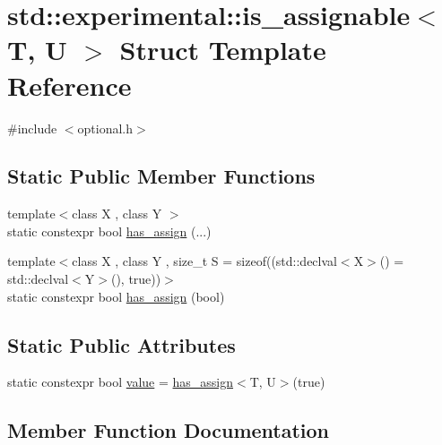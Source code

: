 \hypertarget{structstd_1_1experimental_1_1is__assignable}{}\section{std\+:\+:experimental\+:\+:is\+\_\+assignable$<$ T, U $>$ Struct Template Reference}
\label{structstd_1_1experimental_1_1is__assignable}


{\ttfamily \#include $<$optional.\+h$>$}

\subsection*{Static Public Member Functions}
\begin{DoxyCompactItemize}
\item 
{\footnotesize template$<$class X , class Y $>$ }\\static constexpr bool \mbox{\hyperlink{structstd_1_1experimental_1_1is__assignable_af8698cf73e8d40f6af5bafa292f9e532}{has\+\_\+assign}} (...)
\item 
{\footnotesize template$<$class X , class Y , size\+\_\+t S = sizeof((std\+::declval$<$\+X$>$() = std\+::declval$<$\+Y$>$(), true))$>$ }\\static constexpr bool \mbox{\hyperlink{structstd_1_1experimental_1_1is__assignable_a826902a90f85d2a25cbab409ebe1aff6}{has\+\_\+assign}} (bool)
\end{DoxyCompactItemize}
\subsection*{Static Public Attributes}
\begin{DoxyCompactItemize}
\item 
static constexpr bool \mbox{\hyperlink{structstd_1_1experimental_1_1is__assignable_a670223830052ed42e41e453386027b45}{value}} = \mbox{\hyperlink{structstd_1_1experimental_1_1is__assignable_af8698cf73e8d40f6af5bafa292f9e532}{has\+\_\+assign}}$<$T, U$>$(true)
\end{DoxyCompactItemize}


\subsection{Member Function Documentation}
\mbox{\label{structstd_1_1experimental_1_1is__assignable_af8698cf73e8d40f6af5bafa292f9e532}} 
